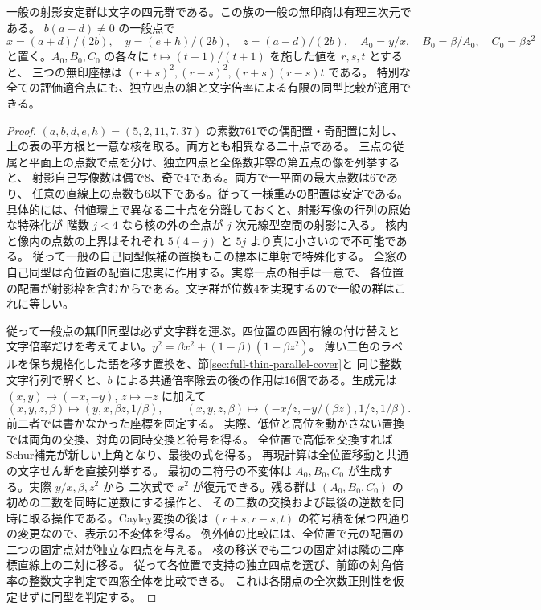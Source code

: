 \begin{corollary}\label{cor:unequal-conic-unmarked-quotient}
一般の射影安定群は文字の四元群である。この族の一般の無印商は有理三次元である。
$b(a-d)\ne0$ の一般点で
\[
 x=(a+d)/(2b),\quad y=(e+h)/(2b),\quad z=(a-d)/(2b),\quad
 A_0=y/x,\quad B_0=\beta/A_0,\quad C_0=\beta z^2
\]
と置く。$A_0,B_0,C_0$ の各々に $t\mapsto(t-1)/(t+1)$ を施した値を $r,s,t$ とすると、
三つの無印座標は $(r+s)^2,(r-s)^2,(r+s)(r-s)t$ である。
特別な全ての評価適合点にも、独立四点の組と文字倍率による有限の同型比較が適用できる。
\end{corollary}
\begin{proof}
$(a,b,d,e,h)=(5,2,11,7,37)$ の素数761での偶配置・奇配置に対し、
上の表の平方根と一意な核を取る。両方とも相異なる二十点である。
三点の従属と平面上の点数で点を分け、独立四点と全係数非零の第五点の像を列挙すると、
射影自己写像数は偶で8、奇で4である。両方で一平面の最大点数は6であり、
任意の直線上の点数も6以下である。従って一様重みの配置は安定である。
具体的には、付値環上で異なる二十点を分離しておくと、射影写像の行列の原始な特殊化が
階数 $j<4$ なら核の外の全点が $j$ 次元線型空間の射影に入る。
核内と像内の点数の上界はそれぞれ $5(4-j)$ と $5j$ より真に小さいので不可能である。
従って一般の自己同型候補の置換もこの標本に単射で特殊化する。
全窓の自己同型は奇位置の配置に忠実に作用する。実際一点の相手は一意で、
各位置の配置が射影枠を含むからである。文字群が位数4を実現するので一般の群はこれに等しい。

従って一般点の無印同型は必ず文字群を運ぶ。四位置の四固有線の付け替えと
文字倍率だけを考えてよい。$y^2=\beta x^2+(1-\beta)(1-\beta z^2)$。
薄い二色のラベルを保ち規格化した語を移す置換を、節\ref{sec:full-thin-parallel-cover}と
同じ整数文字行列で解くと、$b$ による共通倍率除去の後の作用は16個である。生成元は
$(x,y)\mapsto(-x,-y)$, $z\mapsto-z$ に加えて
\[
 (x,y,z,\beta)\longmapsto(y,x,\beta z,1/\beta),\qquad
 (x,y,z,\beta)\longmapsto(-x/z,-y/(\beta z),1/z,1/\beta).
\]
前二者では書かなかった座標を固定する。
実際、低位と高位を動かさない置換では両角の交換、対角の同時交換と符号を得る。
全位置で高低を交換すればSchur補完が新しい上角となり、最後の式を得る。
再現計算は全位置移動と共通の文字せん断を直接列挙する。
最初の二符号の不変体は $A_0,B_0,C_0$ が生成する。実際 $y/x,\beta,z^2$ から
二次式で $x^2$ が復元できる。残る群は $(A_0,B_0,C_0)$ の初めの二数を同時に逆数にする操作と、
その二数の交換および最後の逆数を同時に取る操作である。Cayley変換の後は
$(r+s,r-s,t)$ の符号積を保つ四通りの変更なので、表示の不変体を得る。
例外値の比較には、全位置で元の配置の二つの固定点対が独立な四点を与える。
核の移送でも二つの固定対は隣の二座標直線上の二対に移る。
従って各位置で支持の独立四点を選び、前節の対角倍率の整数文字判定で四窓全体を比較できる。
これは各閉点の全次数正則性を仮定せずに同型を判定する。
\end{proof}
